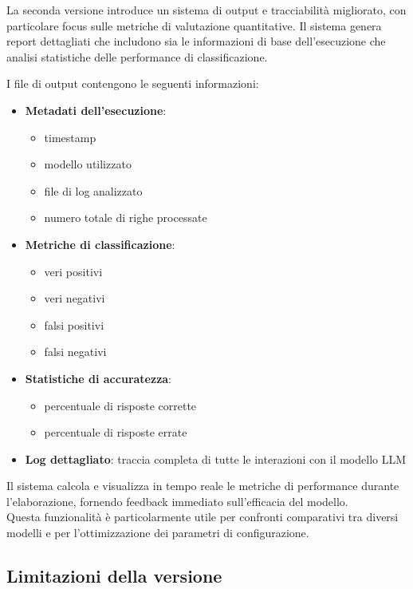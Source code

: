 \documentclass[12pt]{report}
\begin{document}
La seconda versione introduce un sistema di output e tracciabilità migliorato, con particolare focus sulle metriche di valutazione quantitative. Il sistema genera report dettagliati che includono sia le informazioni di base dell'esecuzione che analisi statistiche delle performance di classificazione.

I file di output contengono le seguenti informazioni:
\begin{itemize}
    \item \textbf{Metadati dell'esecuzione}:
          \begin{itemize}
              \item timestamp
              \item modello utilizzato
              \item file di log analizzato
              \item numero totale di righe processate
          \end{itemize}
    \item \textbf{Metriche di classificazione}:
          \begin{itemize}
              \item veri positivi
              \item veri negativi
              \item falsi positivi
              \item falsi negativi
          \end{itemize}
    \item \textbf{Statistiche di accuratezza}:
          \begin{itemize}
              \item percentuale di risposte corrette
              \item percentuale di risposte errate
          \end{itemize}
    \item \textbf{Log dettagliato}: traccia completa di tutte le interazioni con il modello LLM
\end{itemize}

Il sistema calcola e visualizza in tempo reale le metriche di performance durante l'elaborazione, fornendo feedback immediato sull'efficacia del modello. \\
Questa funzionalità è particolarmente utile per confronti comparativi tra diversi modelli e per l'ottimizzazione dei parametri di configurazione.

\subsection{Limitazioni della versione}
\label{subsec:ver2_limitazioni}
\end{document}
